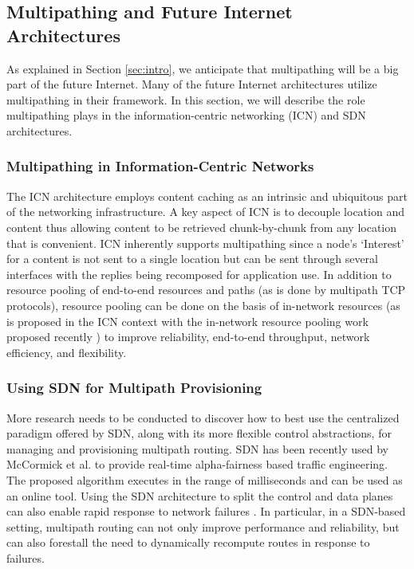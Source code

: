 \documentclass[10pt]{IEEEtran}
\begin{document}
\subsection{Multipathing and Future Internet Architectures}

As explained in Section \ref{sec:intro}, we anticipate that multipathing will be a big part of the future Internet. Many of the future Internet architectures utilize multipathing in their framework. In this section, we will describe the role multipathing plays in the information-centric networking (ICN) and SDN architectures.

\vspace{2mm}
\subsubsection{Multipathing in Information-Centric Networks}

The ICN architecture employs content caching as an intrinsic and ubiquitous part of the networking infrastructure. A key aspect of ICN is to decouple location and content thus allowing content to be retrieved chunk-by-chunk from any location that is convenient. ICN inherently supports multipathing since a node's `Interest' for a content is not sent to a single location but can be sent through several interfaces with the replies being recomposed for application use. In addition to resource pooling of end-to-end resources and paths (as is done by multipath TCP protocols), resource pooling can be done on the basis of in-network resources (as is proposed in the ICN context with the in-network resource pooling work proposed recently \cite{psaras2014revisiting}) to improve reliability, end-to-end throughput, network efficiency, and flexibility.



\vspace{2mm}
\subsubsection{Using SDN for Multipath Provisioning}



More research needs to be conducted to discover how to best use the centralized paradigm offered by SDN, along with its more flexible control abstractions, for managing and provisioning multipath routing. SDN has been recently used by McCormick et al. \cite{McCormick2014SDN} to provide real-time alpha-fairness based traffic engineering. The proposed algorithm executes in the range of milliseconds and can be used as an online tool. Using the SDN architecture to split the control and data planes can also enable rapid response to network failures \cite{caesar2010dynamic}. In particular, in a SDN-based setting, multipath routing can not only improve performance and reliability, but can also forestall the need to dynamically recompute routes in response to failures.
\end{document}
